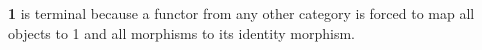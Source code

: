 \textbf{1} is terminal because a functor from any other category is forced to map all objects to 1 and all morphisms to its identity morphism.
